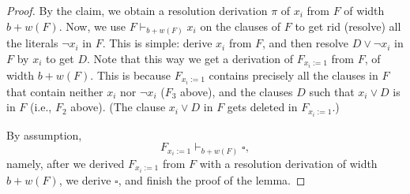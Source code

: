 \begin{proof}
By the claim, we obtain a resolution derivation $\pi$ of $x_i$ from $F$  
of width $b + w(F)$.
Now, we use $F \vdash_{b + w(F)} x_i$ on the clauses of $F$ to get rid (resolve)  
all the literals $\neg x_i$ in $F$.  
This is simple: derive $x_i$ from $F$, and then resolve $D \lor \neg x_i$ in $F$  
by $x_i$ to get $D$.
Note that this way we get a derivation of $F_{x_i := 1}$ from $F$, of width $b + w(F)$.  
This is because $F_{x_i := 1}$ contains precisely all the clauses in $F$ that  
contain neither $x_i$ nor $\neg x_i$ ($F_3$ above), and the clauses $D$  
such that $x_i \lor D$ is in $F$ (i.e., $F_2$ above).  
(The clause $x_i \lor D$ in $F$ gets deleted in $F_{x_i := 1}$.)

By assumption,  
\[
F_{x_i := 1} \vdash_{b + w(F)} \square,
\]
namely, after we derived $F_{x_i := 1}$ from $F$ with a resolution derivation of width $b + w(F)$,  
we derive $\square$, and finish the proof of the lemma.
\end{proof}


 

% 
% 
% 
%  
% 
% 
%  
% 
% 
% 


